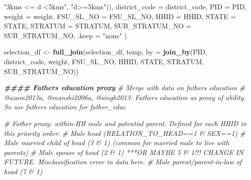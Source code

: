 \documentclass[
]{article}
\newenvironment{Shaded}{\begin{snugshade}}{\end{snugshade}}
\newcommand{\AttributeTok}[1]{\textcolor[rgb]{0.13,0.29,0.53}{#1}}
\newcommand{\CommentTok}[1]{\textcolor[rgb]{0.56,0.35,0.01}{\textit{#1}}}
\newcommand{\DocumentationTok}[1]{\textcolor[rgb]{0.56,0.35,0.01}{\textbf{\textit{#1}}}}
\newcommand{\FunctionTok}[1]{\textcolor[rgb]{0.13,0.29,0.53}{\textbf{#1}}}
\newcommand{\NormalTok}[1]{#1}
\newcommand{\OtherTok}[1]{\textcolor[rgb]{0.56,0.35,0.01}{#1}}
\newcommand{\StringTok}[1]{\textcolor[rgb]{0.31,0.60,0.02}{#1}}
\newcounter{none} %
\begin{document}
\begin{Shaded}
\begin{Highlighting}[]
                 \StringTok{"3kms \textless{}= d \textless{}5kms"}\NormalTok{,}
                 \StringTok{"d\textgreater{}=5kms"}\NormalTok{)),}
    \AttributeTok{district\_code =}\NormalTok{ district\_code,}
    \AttributeTok{PID =}\NormalTok{ PID,}
    \AttributeTok{weight =}\NormalTok{ weight,}
    \AttributeTok{FSU\_SL\_NO =}\NormalTok{ FSU\_SL\_NO,}
    \AttributeTok{HHID =}\NormalTok{ HHID,}
    \AttributeTok{STATE =}\NormalTok{ STATE, }
    \AttributeTok{STRATUM =}\NormalTok{ STRATUM, }
    \AttributeTok{SUB\_STRATUM\_NO =}\NormalTok{ SUB\_STRATUM\_NO,}
    \AttributeTok{.keep =} \StringTok{"none"}
\NormalTok{  )}

\NormalTok{selection\_df }\OtherTok{\textless{}{-}} \FunctionTok{full\_join}\NormalTok{(selection\_df, temp, }\AttributeTok{by =} \FunctionTok{join\_by}\NormalTok{(PID, district\_code, weight, FSU\_SL\_NO, HHID, STATE, STRATUM, SUB\_STRATUM\_NO))}




\DocumentationTok{\#\#\#\# Father\textquotesingle{}s education proxy}
\CommentTok{\# Merge with data on father\textquotesingle{}s education}
\CommentTok{\# @azam2013a, @munshi2006a, @singh2013: Father\textquotesingle{}s education as proxy of ability. So use father\textquotesingle{}s education for father\_educ}

\CommentTok{\# Father proxy: within{-}HH male and potential parent. Defined for each HHID in this priority order:}
\CommentTok{\# Male head (RELATION\_TO\_HEAD==1 \& SEX==1)}
\CommentTok{\# Male married child of head (3 \& 1) (common for married male to live with parents)}
\CommentTok{\# Male spouse of head (2 \& 1) ***OR MAYBE 5 \& 1!!! CHANGE IN FUTURE. Misclassification error in data here.}
\CommentTok{\# Male parent/parent{-}in{-}law of head (7 \& 1)}


\end{Highlighting}
\end{Shaded}
\end{document}
